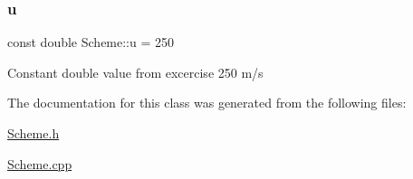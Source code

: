 \subsubsection{\texorpdfstring{u}{u}}
{\footnotesize\ttfamily const double Scheme\+::u = 250\hspace{0.3cm}{\ttfamily [protected]}}

Constant double value from excercise 250 m/s 

The documentation for this class was generated from the following files\+:\begin{DoxyCompactItemize}
\item 
\mbox{\hyperlink{_scheme_8h}{Scheme.\+h}}\item 
\mbox{\hyperlink{_scheme_8cpp}{Scheme.\+cpp}}\end{DoxyCompactItemize}
